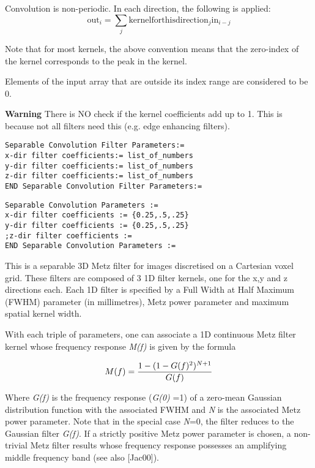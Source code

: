 \documentclass{article}
\begin{document}
Convolution is non-periodic. In each direction, the following 
is applied: 
\[
\mathrm{out}_i = \sum_{j} \mathrm{kernelforthisdirection}_{j} \mathrm{in}_{i-j}
\]

Note that for most kernels, the above convention means that the 
zero-index of the kernel corresponds to the peak in the kernel. 



Elements of the input array that are outside its index range 
are considered to be 0. 


\textbf{Warning} There is NO check if the kernel coefficients add 
up to 1. This is because not all filters need this (e.g. edge 
enhancing filters).

{ 
}
\begin{verbatim}
Separable Convolution Filter Parameters:=
x-dir filter coefficients:= list_of_numbers
y-dir filter coefficients:= list_of_numbers
z-dir filter coefficients:= list_of_numbers
END Separable Convolution Filter Parameters:=
\end{verbatim}

{ 
}
\begin{verbatim}
Separable Convolution Parameters := 
x-dir filter coefficients := {0.25,.5,.25} 
y-dir filter coefficients := {0.25,.5,.25} 
;z-dir filter coefficients :=
END Separable Convolution Parameters :=
\end{verbatim}

{ 
}

This is a separable 3D Metz filter for images discretised on 
a Cartesian voxel grid. These filters are composed of 3 1D filter 
kernels, one for the x,y and z directions each. Each 1D filter 
is specified by a Full Width at Half Maximum (FWHM) parameter 
(in millimetres), Metz power parameter and maximum spatial kernel 
width. 



With each triple of parameters, one can associate a 1D continuous 
Metz filter kernel whose frequency response \textit{M(f)} is given 
by the formula

\[
M(f)=
{1-(1-G(f)^2)^{N+1}
\over
G(f)
}
\]

Where \textit{G(f)} is the frequency response (\textit{G(0)} =1) of a zero-mean 
Gaussian distribution function with the associated FWHM and \textit{N} 
is the associated Metz power parameter. Note that in the special 
case \textit{N}=0, the filter reduces to the Gaussian filter \textit{G(f)}. 
If a strictly positive Metz power parameter is chosen, a non-trivial 
Metz filter results whose frequency response possesses an amplifying 
middle frequency band (see also [Jac00]).
\end{document}
